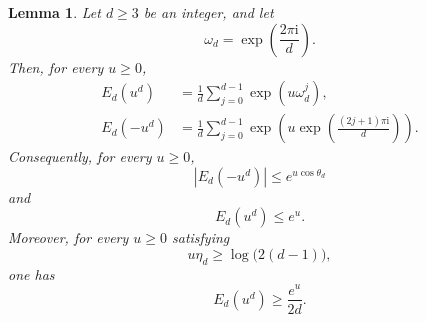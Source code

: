 \documentclass[twoside,12pt]{article}
\newtheorem{lemma}[theorem]{Lemma}
\theoremstyle{definition}
\theoremstyle{remark}
\newcommand{\1}{\mathbf 1}
\begin{document}
\begin{lemma}\label{lem:root-unity}
Let $d\ge3$ be an integer, and let
\[
 \omega_d=\exp\!\left(\frac{2\pi\mathrm i}{d}\right).
\]
Then, for every $u\ge0$,
\begin{align}
 E_d(u^d)
 &=\frac1d\sum_{j=0}^{d-1}\exp(u\omega_d^j),
 \label{eq:positive-root-filter}\\
 E_d(-u^d)
 &=\frac1d\sum_{j=0}^{d-1}
 \exp\!\left(u\exp\!\left(\frac{(2j+1)\pi\mathrm i}{d}\right)\right).
 \label{eq:negative-root-filter}
\end{align}
Consequently, for every $u\ge0$,
\begin{equation}\label{eq:negative-axis-bound}
 |E_d(-u^d)|\le e^{u\cos\theta_d}
\end{equation}
and
\begin{equation}\label{eq:positive-axis-upper}
 E_d(u^d)\le e^u.
\end{equation}
Moreover, for every $u\ge0$ satisfying
\begin{equation}\label{eq:positive-axis-condition}
 u\eta_d\ge\log\bigl(2(d-1)\bigr),
\end{equation}
one has
\begin{equation}\label{eq:positive-axis-lower}
 E_d(u^d)\ge\frac{e^u}{2d}.
\end{equation}
\end{lemma}
\end{document}
